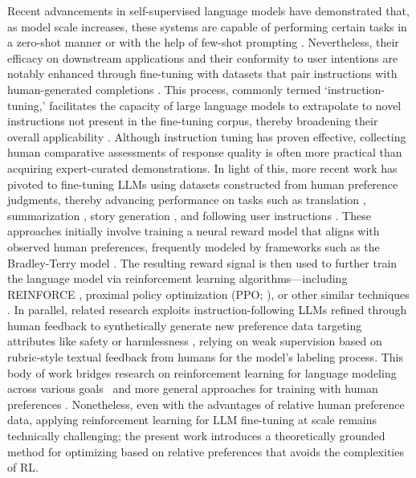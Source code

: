 Recent advancements in self-supervised language models have demonstrated that, as model scale increases, these systems are capable of performing certain tasks in a zero-shot manner \citep{radford2019language} or with the help of few-shot prompting \citep{gpt3,megatron,chowdhery2022palm}. Nevertheless, their efficacy on downstream applications and their conformity to user intentions are notably enhanced through fine-tuning with datasets that pair instructions with human-generated completions \citep{mishra-etal-2022-cross,sanh2022multitask,chung2022scaling,thoppilan2022lamda}. This process, commonly termed `instruction-tuning,' facilitates the capacity of large language models to extrapolate to novel instructions not present in the fine-tuning corpus, thereby broadening their overall applicability \citep{chung2022scaling}. Although instruction tuning has proven effective, collecting human comparative assessments of response quality is often more practical than acquiring expert-curated demonstrations. In light of this, more recent work has pivoted to fine-tuning LLMs using datasets constructed from human preference judgments, thereby advancing performance on tasks such as translation \citep{kreutzer-etal-2018-reliability}, summarization \citep{stiennon2022learning,ziegler2020finetuning}, story generation \citep{ziegler2020finetuning}, and following user instructions \citep{ouyang2022training,ramamurthy2023is}. These approaches initially involve training a neural reward model that aligns with observed human preferences, frequently modeled by frameworks such as the Bradley-Terry model \citep{bradley1952rankanalysis}. The resulting reward signal is then used to further train the language model via reinforcement learning algorithms—including REINFORCE \citep{williams1992reinforce}, proximal policy optimization (PPO; \cite{schulman2017proximal}), or other similar techniques \citep{ramamurthy2023is}. In parallel, related research exploits instruction-following LLMs refined through human feedback to synthetically generate new preference data targeting attributes like safety or harmlessness \citep{bai2022constitutional}, relying on weak supervision based on rubric-style textual feedback from humans for the model's labeling process. This body of work bridges research on reinforcement learning for language modeling across various goals~\citep{Ranzato2015SequenceLT,paulus2018a,wu2018learning} and more general approaches for training with human preferences \citep{christiano2017deep,kupcsik2018learning}. Nonetheless, even with the advantages of relative human preference data, applying reinforcement learning for LLM fine-tuning at scale remains technically challenging; the present work introduces a theoretically grounded method for optimizing based on relative preferences that avoids the complexities of RL.

